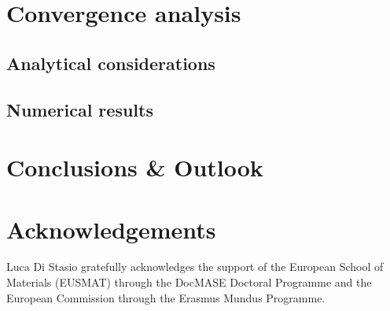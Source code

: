 \documentclass[review]{elsarticle}
\begin{document}
\section{Convergence analysis}

\subsection{Analytical considerations}

\subsection{Numerical results}

\section{Conclusions \& Outlook}

\section*{Acknowledgements}

Luca Di Stasio gratefully acknowledges the support of the European School of Materials (EUSMAT) through the DocMASE Doctoral Programme and the European Commission through the Erasmus Mundus Programme.


\end{document}

